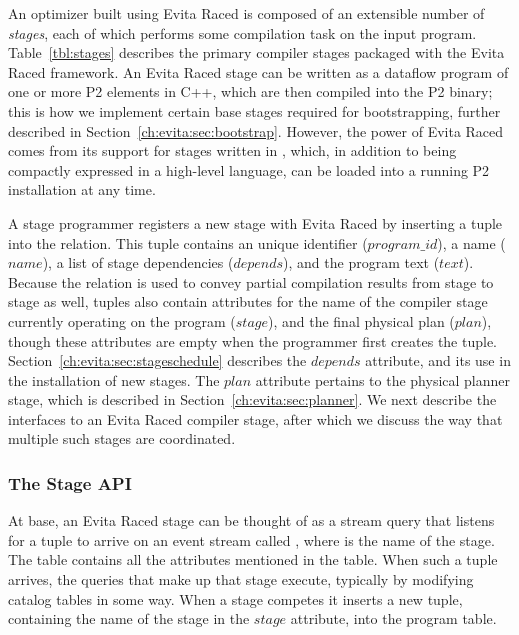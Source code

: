 An optimizer built using Evita Raced is composed of an extensible number of
{\em stages}, each of which performs some compilation task on the input
program.  Table~\ref{tbl:stages} describes the primary compiler stages packaged
with the Evita Raced framework.  An Evita Raced stage can be written as a
dataflow program of one or more P2 elements in C++, which are then compiled
into the P2 binary; this is how we implement certain base stages required for
bootstrapping, further described in Section~\ref{ch:evita:sec:bootstrap}.  However,
the power of Evita Raced comes from its support for stages written in \OVERLOG,
which, in addition to being compactly expressed in a high-level language, can
be loaded into a running P2 installation at any time.

A stage programmer registers a new stage with Evita Raced by inserting a tuple
into the  relation.  This tuple contains an unique identifier
($program\_id$), a name ($name$), a list of stage dependencies ($depends$), and
the program text ($text$).  Because the  relation is used to convey
partial compilation results from stage to stage as well,  tuples
also contain attributes for the name of the compiler stage currently operating
on the program ($stage$), and the final physical plan ($plan$), though these
attributes are empty when the programmer first creates the tuple.
Section~\ref{ch:evita:sec:stageschedule} describes the $depends$ attribute, and
its use in the installation of new stages.  The $plan$ attribute pertains to
the physical planner stage, which is described in
Section~\ref{ch:evita:sec:planner}.  We next describe the interfaces to an
Evita Raced compiler stage, after which we discuss the way that multiple such
stages are coordinated.

\subsubsection{The Stage API}
\label{ch:evita:sec:stages}

At base, an Evita Raced stage can be thought of as a stream query that listens
for a tuple to arrive on an event stream called ,
where  is the name of the stage.  The 
table contains all the attributes mentioned in the  table.  When
such a tuple arrives, the queries that make up that stage execute, typically by
modifying catalog tables in some way.  When a stage competes it inserts a new
 tuple, containing the name of the stage in the $stage$ attribute,
into the program table.

